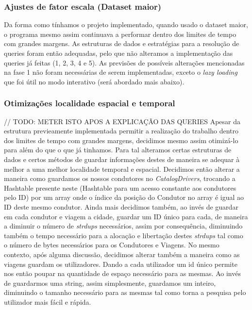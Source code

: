\documentclass{article}
\begin{document}
        \subsubsection{Ajustes de fator escala (Dataset maior)}
            Da forma como tínhamos o projeto implementado, quando 
            usado o dataset maior, o programa mesmo assim continuava
            a performar dentro dos limites de tempo com grandes 
            margens. As estruturas de dados e estratégias para
            a resolução de queries foram então adequadas, pelo que
            não alteramos a implementação das queries já feitas
            (1, 2, 3, 4 e 5). As previsões de possíveis alterações
            mencionadas na fase 1 não foram necessárias de serem
            implementadas, exceto o \emph{lazy loading} que foi
            útil no modo interativo (será abordado mais abaixo).

        \subsubsection{Otimizações localidade espacial e temporal}
        // TODO: METER ISTO APOS A EXPLICAÇÃO DAS QUERIES
            Apesar da estrutura previeamente implementada permitir a realização
            do trabalho dentro dos limites de tempo com grandes margens, decidimos
            mesmo assim otimizá-lo para além do que o que já tinhamos. Para tal
            alteramos certas estruturas de dados e certos métodos de guardar 
            informações destes de maneira se adequar à melhor a uma melhor localidade 
            temporal e espacial. Decidimos então alterar a maneira como guardamos os 
            nossos condutores no \emph{CatalogDrivers}, trocando a Hashtable presente
            neste (Hashtable para um acesso constante aos condutores pelo ID) por um 
            array onde o índice da posição do Condutor no array é igual ao ID deste 
            mesmo condutor. Ainda mais decidimos também, ao invés de guardar em cada 
            condutor e viagem a cidade, guardar um ID único para cada, de maneira a 
            diminuir o número de \emph{strdups} necessários, assim por consequência, 
            diminuindo também o tempo necessário para a alocação e libertação destes 
            \emph{strdups} tal como o número de bytes necessários para os Condutores e
            Viagens. No mesmo contexto, após alguma discussão, decidimos alterar também
            a maneira como as viagens guardam os utilizadores. Dando a cada utilizador um
            id único permite nos então poupar na quantidade de espaço necessário para as mesmas.
            Ao invés de guardarmos uma string, assim simplesmente, guardamos um inteiro, diminuindo
            o tamanho necessário para as mesmas tal como torna a pesquisa pelo utilizador 
            mais fácil e rápida.
\end{document}
